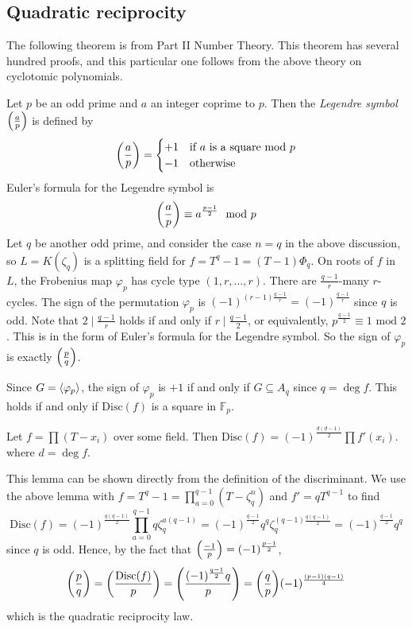 \subsection{Quadratic reciprocity}
The following theorem is from Part II Number Theory.
This theorem has several hundred proofs, and this particular one follows from the above theory on cyclotomic polynomials.

Let \( p \) be an odd prime and \( a \) an integer coprime to \( p \).
Then the \emph{Legendre symbol} \( \qty(\frac a p) \) is defined by
\[ \qty(\frac a p) = \begin{cases}
	+1 & \text{if } a \text{ is a square mod } p \\
	-1 & \text{otherwise}
\end{cases} \]
Euler's formula for the Legendre symbol is
\[ \qty(\frac a p) \equiv a^{\frac{p-1}{2}} \mod p \]
Let \( q \) be another odd prime, and consider the case \( n = q \) in the above discussion, so \( L = K(\zeta_q) \) is a splitting field for \( f = T^q - 1 = (T - 1) \Phi_q \).
On roots of \( f \) in \( L \), the Frobenius map \( \varphi_p \) has cycle type \( (1, r, \dots, r) \).
There are \( \frac{q-1}{r} \)-many \( r \)-cycles.
The sign of the permutation \( \varphi_p \) is \( (-1)^{(r-1) \frac{q-1}{r}} = (-1)^{\frac{q-1}{r}} \) since \( q \) is odd.
Note that \( 2 \mid \frac{q-1}{r} \) holds if and only if \( r \mid \frac{q-1}{2} \), or equivalently, \( p^{\frac{q-1}{2}} \equiv 1 \text{ mod } 2 \).
This is in the form of Euler's formula for the Legendre symbol.
So the sign of \( \varphi_p \) is exactly \( \qty(\frac p q) \).

Since \( G = \left\langle{} \varphi_p \right\rangle \), the sign of \( \varphi_p \) is \( +1 \) if and only if \( G \subseteq A_q \) since \( q = \deg f \).
This holds if and only if \( \mathrm{Disc}(f) \) is a square in \( \mathbb F_p \).
\begin{lemma}
	Let \( f = \prod (T - x_i) \) over some field.
	Then \( \mathrm{Disc}(f) = (-1)^{\frac{d(d-1)}{2}} \prod f'(x_i) \).
	where \( d = \deg f \).
\end{lemma}
This lemma can be shown directly from the definition of the discriminant.
We use the above lemma with \( f = T^q - 1 = \prod_{a=0}^{q-1}(T - \zeta_q^n) \) and \( f' = qT^{q-1} \) to find
\[ \mathrm{Disc}(f) = (-1)^{\frac{q(q-1)}{2}} \prod_{a=0}^{q-1} q \zeta_q^{a(q-1)} = (-1)^{\frac{q-1}{2}} q^q \zeta_q^{(q-1)\frac{q(q-1)}{2}} = (-1)^{\frac{q-1}{2}} q^q \]
since \( q \) is odd.
Hence, by the fact that \( \qty(\frac{-1}{p}) = (-1)^{\frac{p-1}{2}} \),
\[ \qty(\frac p q) = \qty(\frac{\mathrm{Disc}(f)}{p}) = \qty(\frac{(-1)^{\frac{q-1}{2}}q}{p}) = \qty(\frac{q}{p}) (-1)^{\frac{(p-1)(q-1)}{4}} \]
which is the quadratic reciprocity law.

